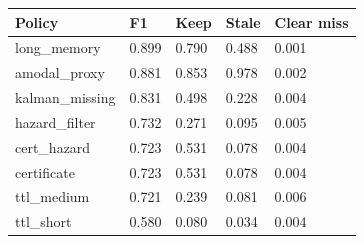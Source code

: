 \begin{tabular}{lllll}
\toprule
Policy & F1 & Keep & Stale & Clear miss \\
\midrule
long\_memory & 0.899 & 0.790 & 0.488 & 0.001 \\
amodal\_proxy & 0.881 & 0.853 & 0.978 & 0.002 \\
kalman\_missing & 0.831 & 0.498 & 0.228 & 0.004 \\
hazard\_filter & 0.732 & 0.271 & 0.095 & 0.005 \\
cert\_hazard & 0.723 & 0.531 & 0.078 & 0.004 \\
certificate & 0.723 & 0.531 & 0.078 & 0.004 \\
ttl\_medium & 0.721 & 0.239 & 0.081 & 0.006 \\
ttl\_short & 0.580 & 0.080 & 0.034 & 0.004 \\
\bottomrule
\end{tabular}
